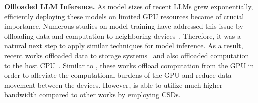 \textbf{Offloaded LLM Inference.}
As model sizes of recent LLMs grew exponentially, efficiently deploying these models on limited GPU resources became of crucial importance.
Numerous studies on model training have addressed this issue by offloading data and computation to neighboring devices~\cite{zerooffload, zeroinfinity, flashneuron, smartinfinity}.
Therefore, it was a natural next step to apply similar techniques for model inference.
As a result, recent works offloaded data to storage systems~\cite{flexgen, llminaflash, leviathan} and also offloaded computation to the host CPU~\cite{flexgen, powerinfer, hetegen}.
Similar to \thiswork, these works offload computation from the GPU in order to alleviate the computational burdens of the GPU and reduce data movement between the devices.
However, \thiswork is able to utilize much higher bandwidth compared to other works by employing CSDs.

